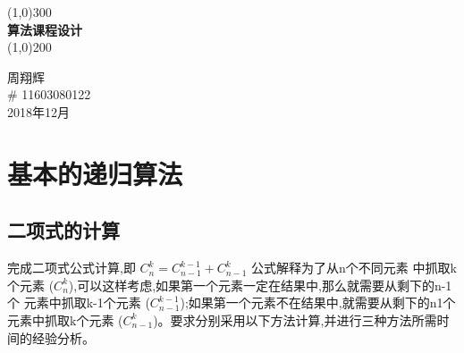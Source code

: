 \documentclass{ctexart}
\begin{document}
\begin{titlepage}
    \begin{center}
        \line(1,0){300} \\
        [0.25in]
        \huge{\bfseries 算法课程设计} \\
        [2mm]
        \line(1,0){200} \\
        [16cm]
    \end{center}

    \begin{flushright}
        \textsc{\large 周翔辉\\
            \# 11603080122 \\
            2018年12月\\
        }
    \end{flushright}
\end{titlepage}

\tableofcontents
\cleardoublepage

\newpage
{}

\setcounter{page}{1}
\section{基本的递归算法}
\subsection{二项式的计算}
完成二项式公式计算,即 $C_n^k = C_{n-1}^{k-1} + C_{n-1}^k$ 公式解释为了从n个不同元素
中抓取k个元素 ($C_n^k$),可以这样考虑,如果第一个元素一定在结果中,那么就需要从剩下的n-1个
元素中抓取k-1个元素 ($C_{n-1}^{k-1}$);如果第一个元素不在结果中,就需要从剩下的n1个元素中抓取k个元素
($C_{n-1}^k$)。要求分别采用以下方法计算,并进行三种方法所需时间的经验分析。
\end{document}
